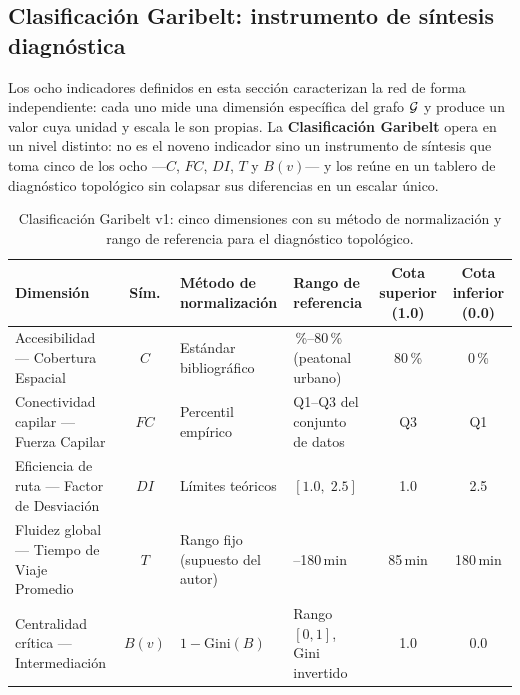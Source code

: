 

\subsection{Clasificación Garibelt: instrumento de síntesis diagnóstica}
\label{subsec:clasificacion-garibelt}

Los ocho indicadores definidos en esta sección caracterizan la red de forma
independiente: cada uno mide una dimensión específica del grafo $\mathcal{G}$ y
produce un valor cuya unidad y escala le son propias. La
\textbf{Clasificación Garibelt} opera en un nivel distinto: no es el noveno
indicador sino un instrumento de síntesis que toma cinco de los ocho ---$C$,
$FC$, $DI$, $T$ y $B(v)$--- y los reúne en un tablero de diagnóstico topológico
sin colapsar sus diferencias en un escalar único.

\begin{table}[htbp]
\centering
\small
\caption[Clasificación Garibelt v1: dimensiones, métodos de normalización y rangos de referencia]{%
    Clasificación Garibelt v1: cinco dimensiones con su método de normalización
    y rango de referencia para el diagnóstico topológico.}
\label{tab:clasificacion-garibelt-dims}
\begin{tabularx}{\textwidth}{>{\raggedright\arraybackslash}X c >{\raggedright\arraybackslash}l >{\raggedright\arraybackslash}X c c}
    \toprule
    \textbf{Dimensión} & \textbf{Sím.} &
    \textbf{Método de normalización} &
    \textbf{Rango de referencia} &
    \textbf{Cota superior (1.0)} & \textbf{Cota inferior (0.0)} \\
    \midrule
    Accesibilidad — Cobertura Espacial
      & $C$ & Estándar bibliográfico
      & 0\,\%–80\,\% (peatonal urbano) & 80\,\% & 0\,\% \\
    Conectividad capilar — Fuerza Capilar
      & $FC$ & Percentil empírico
      & Q1–Q3 del conjunto de datos & Q3 & Q1 \\
    Eficiencia de ruta — Factor de Desviación
      & $DI$ & Límites teóricos
      & $[1.0,\;2.5]$ & 1.0 & 2.5 \\
    Fluidez global — Tiempo de Viaje Promedio
      & $T$ & Rango fijo (supuesto del autor)
      & 85–180\,min & 85\,min & 180\,min \\
    Centralidad crítica — Intermediación
      & $B(v)$ & $1 - \mathrm{Gini}(B)$
      & Rango $[0,1]$, Gini invertido & 1.0 & 0.0 \\
    \bottomrule
\end{tabularx}
\smallskip
{}
\end{table}




